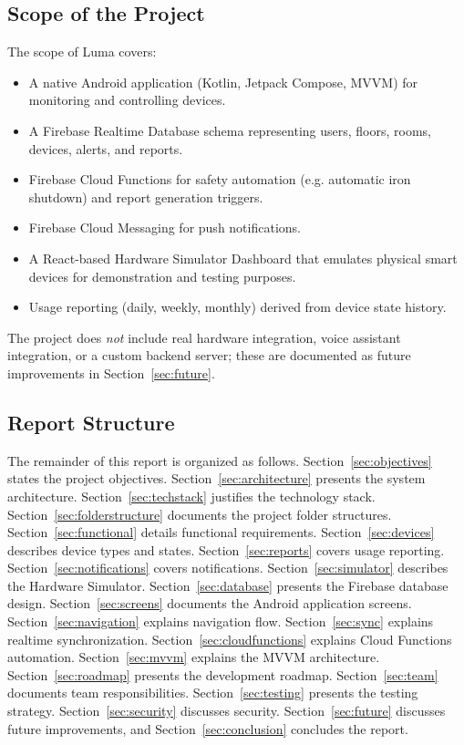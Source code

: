 \documentclass[11pt,a4paper]{article}
\begin{document}
\subsection{Scope of the Project}
The scope of Luma covers:
\begin{itemize}
    \item A native Android application (Kotlin, Jetpack Compose, MVVM) for monitoring and controlling devices.
    \item A Firebase Realtime Database schema representing users, floors, rooms, devices, alerts, and reports.
    \item Firebase Cloud Functions for safety automation (e.g. automatic iron shutdown) and report generation triggers.
    \item Firebase Cloud Messaging for push notifications.
    \item A React-based Hardware Simulator Dashboard that emulates physical smart devices for demonstration and testing purposes.
    \item Usage reporting (daily, weekly, monthly) derived from device state history.
\end{itemize}
The project does \emph{not} include real hardware integration, voice assistant integration, or a custom backend server; these are documented as future improvements in Section~\ref{sec:future}.

\subsection{Report Structure}
The remainder of this report is organized as follows. Section~\ref{sec:objectives} states the project objectives. Section~\ref{sec:architecture} presents the system architecture. Section~\ref{sec:techstack} justifies the technology stack. Section~\ref{sec:folderstructure} documents the project folder structures. Section~\ref{sec:functional} details functional requirements. Section~\ref{sec:devices} describes device types and states. Section~\ref{sec:reports} covers usage reporting. Section~\ref{sec:notifications} covers notifications. Section~\ref{sec:simulator} describes the Hardware Simulator. Section~\ref{sec:database} presents the Firebase database design. Section~\ref{sec:screens} documents the Android application screens. Section~\ref{sec:navigation} explains navigation flow. Section~\ref{sec:sync} explains realtime synchronization. Section~\ref{sec:cloudfunctions} explains Cloud Functions automation. Section~\ref{sec:mvvm} explains the MVVM architecture. Section~\ref{sec:roadmap} presents the development roadmap. Section~\ref{sec:team} documents team responsibilities. Section~\ref{sec:testing} presents the testing strategy. Section~\ref{sec:security} discusses security. Section~\ref{sec:future} discusses future improvements, and Section~\ref{sec:conclusion} concludes the report.
\end{document}
